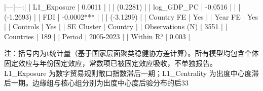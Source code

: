 |---|---:|
| L1_Exposure | 0.0011 |
|  | (0.2281) |
| log_GDP_PC | -0.0516 |
|  | (-1.2693) |
| FDI | -0.0002*** |
|  | (-3.1299) |
| Country FE | Yes |
| Year FE | Yes |
| Controls | Yes |
| SE Cluster | Country |
| Observations (N) | 3551 |
| Countries | 189 |
| Period | 2005-2023 |
| Within R² | 0.003 |

注：括号内为t统计量（基于国家层面聚类稳健协方差计算）。所有模型均包含个体固定效应与年份固定效应，常数项已被固定效应吸收，不单独报告。
L1_Exposure 为数字贸易规则敞口指数滞后一期；L1_Centrality 为出度中心度滞后一期。边缘组与核心组分别为出度中心度后验分布的后33%